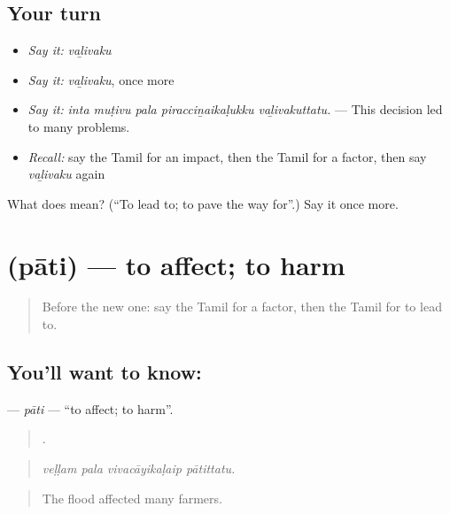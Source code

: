 \subsection*{Your turn}
\begin{itemize}
\raggedright
  \item \emph{Say it:} \emph{vaḻivaku}
  \item \emph{Say it:} \emph{vaḻivaku}, once more
  \item \emph{Say it:} \emph{inta muṭivu pala piracciṉaikaḷukku vaḻivakuttatu.} — This decision led to many problems.
  \item \emph{Recall:} say the Tamil for an impact, then the Tamil for a factor, then say \emph{vaḻivaku} again
\end{itemize}

\begin{tcolorbox}[breakable,colback=teal!4,colframe=teal!35!black,title={Before you move on}]
What does  mean? (\textquotedblleft{}To lead to; to pave the way for\textquotedblright{}.) Say it once more.
\end{tcolorbox}
\section[\texorpdfstring{\ta{பாதி} (pāti)}{பாதி (pāti)}]{ (pāti) — to affect; to harm}

\label{lesson:TA-C352-pati}



\begin{quote}
Before the new one: say the Tamil for a factor, then the Tamil for to lead to.
\end{quote}

\subsection*{You'll want to know: }
\textbf{} — \emph{pāti} — \textquotedblleft{}to affect; to harm\textquotedblright{}.

\begin{quote}
   .
\end{quote}

\begin{quote}
\emph{veḷḷam pala vivacāyikaḷaip pātittatu.}
\end{quote}

\begin{quote}
The flood affected many farmers.
\end{quote}

